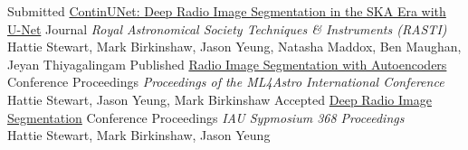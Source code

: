 \documentclass[9pt]{developercv} %
\begin{document}
\begin{entrylist}
    \entry
		{Submitted}
		{\href{https://hstewart93.github.io/files/continunet_rasti_29_02_2024.pdf}{ContinUNet: Deep Radio Image Segmentation in the SKA Era with U-Net}}
		{Journal}
		{\textnormal{\textit{Royal Astronomical Society Techniques \& Instruments         (RASTI)}} \\
            Hattie Stewart, Mark Birkinshaw, Jason Yeung, Natasha Maddox, Ben Maughan,    Jeyan Thiyagalingam}
    \entry
		{Published}
		{\href{https://doi.org/10.1007/978-3-031-34167-0_28}{Radio Image Segmentation with Autoencoders}}
		{Conference Proceedings}
		{\textnormal{\textit{Proceedings of the ML4Astro International Conference}} \\Hattie Stewart, Jason Yeung, Mark Birkinshaw}
	\entry
		{Accepted}
		{\href{https://hstewart93.github.io/files/Proceedings_of_the_International_Astronomical_Union_Deep_Radio_Image_Segmentation.pdf}{Deep Radio Image Segmentation}}
		{Conference Proceedings}
		{\textnormal{\textit{IAU Sypmosium 368 Proceedings}} \\Hattie Stewart, Mark Birkinshaw, Jason Yeung}
\end{entrylist}
\end{document}
